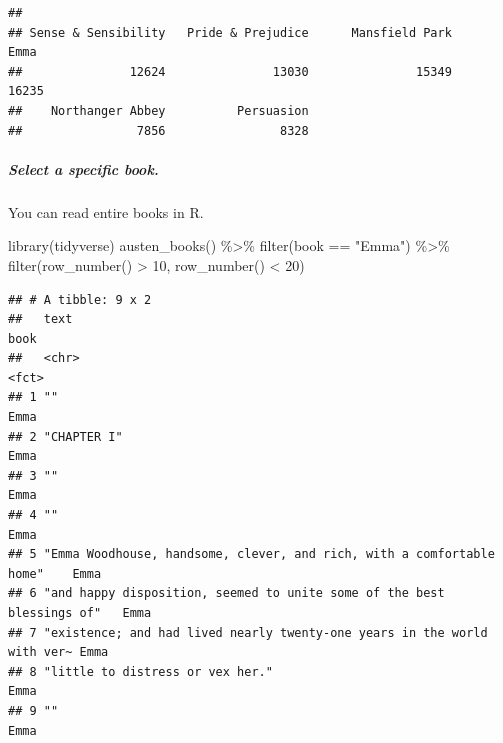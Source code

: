 \documentclass[
]{book}
\newenvironment{Shaded}{\begin{snugshade}}{\end{snugshade}}
\newcommand{\DecValTok}[1]{\textcolor[rgb]{0.00,0.00,0.81}{#1}}
\newcommand{\FunctionTok}[1]{\textcolor[rgb]{0.00,0.00,0.00}{#1}}
\newcommand{\NormalTok}[1]{#1}
\newcommand{\SpecialCharTok}[1]{\textcolor[rgb]{0.00,0.00,0.00}{#1}}
\newcommand{\StringTok}[1]{\textcolor[rgb]{0.31,0.60,0.02}{#1}}
\begin{document}
\begin{verbatim}
## 
## Sense & Sensibility   Pride & Prejudice      Mansfield Park                Emma 
##               12624               13030               15349               16235 
##    Northanger Abbey          Persuasion 
##                7856                8328
\end{verbatim}

\hypertarget{select-a-specific-book.}{%
\subparagraph{Select a specific book.}\label{select-a-specific-book.}}

You can read entire books in R.

\begin{Shaded}
\begin{Highlighting}[]
\FunctionTok{library}\NormalTok{(tidyverse)}
\FunctionTok{austen\_books}\NormalTok{() }\SpecialCharTok{\%\textgreater{}\%}
  \FunctionTok{filter}\NormalTok{(book }\SpecialCharTok{==} \StringTok{"Emma"}\NormalTok{) }\SpecialCharTok{\%\textgreater{}\%}
  \FunctionTok{filter}\NormalTok{(}\FunctionTok{row\_number}\NormalTok{() }\SpecialCharTok{\textgreater{}} \DecValTok{10}\NormalTok{, }\FunctionTok{row\_number}\NormalTok{() }\SpecialCharTok{\textless{}} \DecValTok{20}\NormalTok{)}
\end{Highlighting}
\end{Shaded}

\begin{verbatim}
## # A tibble: 9 x 2
##   text                                                                     book 
##   <chr>                                                                    <fct>
## 1 ""                                                                       Emma 
## 2 "CHAPTER I"                                                              Emma 
## 3 ""                                                                       Emma 
## 4 ""                                                                       Emma 
## 5 "Emma Woodhouse, handsome, clever, and rich, with a comfortable home"    Emma 
## 6 "and happy disposition, seemed to unite some of the best blessings of"   Emma 
## 7 "existence; and had lived nearly twenty-one years in the world with ver~ Emma 
## 8 "little to distress or vex her."                                         Emma 
## 9 ""                                                                       Emma
\end{verbatim}

\hypertarget{section}{%
\subsubsection*{}\label{section}}
\end{document}

